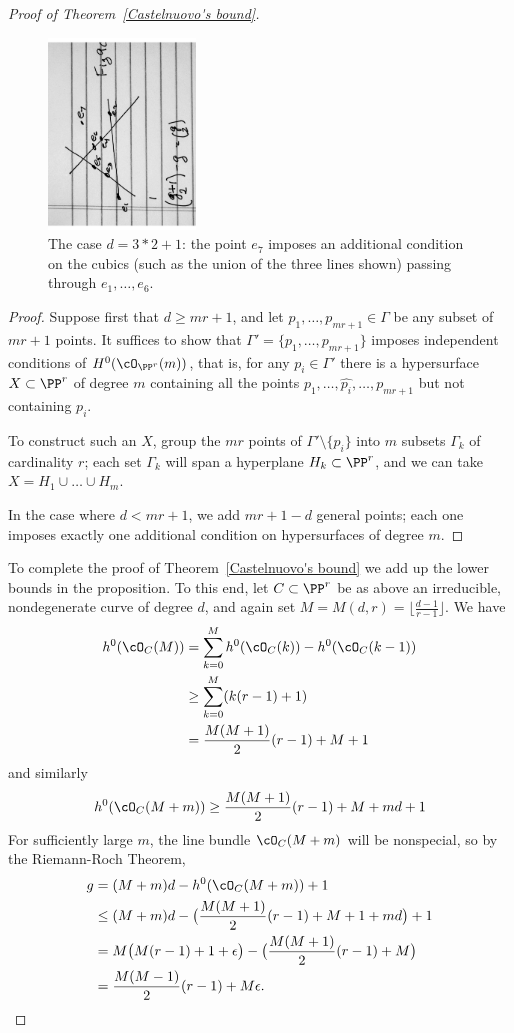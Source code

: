 \begin{proof}[Proof of Theorem~\ref{Castelnuovo's bound}]
\begin{figure}
\begin{center}
\centerline {\includegraphics[height=2in]{"Fig9C.pdf"}}
\caption{The case $d = 3*2+1$: the point $e_{7}$ imposes an additional
condition on the cubics (such as the union of the three lines shown) passing through
$e_{1},\dots, e_{6}$.}
\label{Fig9C}
\end{center}
\end{figure}

\begin{proof}
Suppose first that $d \geq mr+1$, and let $p_1,\dots,p_{mr+1} \in \Gamma$ be any subset of $mr+1$ points. It suffices to show that $\Gamma' = \{p_1,\dots,p_{mr+1}\}$ imposes independent conditions of $H^0(\cO_{\PP^r}(m))$, that is, for any $p_i \in \Gamma'$ there is a hypersurface $X \subset \PP^r$ of degree $m$ containing all the points $p_1,\dots, \hat{p_i},\dots,p_{mr+1}$ but not containing $p_i$.

To construct such an $X$, group the $mr$ points of $\Gamma' \setminus \{p_i\}$ into $m$ subsets $\Gamma_k$ of cardinality $r$; each set $\Gamma_k$ will span a hyperplane $H_k \subset \PP^r$, and we can take $X = H_1 \cup \dots \cup H_m$. 

In the case where $d<mr+1$, we add $mr+1-d$ general points; each one imposes exactly one
additional condition on hypersurfaces of degree $m$.
\end{proof}


To complete the proof of Theorem~\ref{Castelnuovo's bound} we add up the lower bounds in the proposition. To this end, let $C \subset \PP^r$ be as above an irreducible, nondegenerate curve of degree $d$, and again set 
$M = M(d,r) = \lfloor{\frac{d-1}{r-1}}\rfloor$.
We have 
\begin{align*}
h^0(\cO_C(M)) &= \sum_{k=0}^M h^0(\cO_C(k)) - h^0(\cO_C(k-1)) \\
&\geq  \sum_{k=0}^M (k(r-1)+1) \\
&= \frac{M(M+1)}{2}(r-1) + M + 1
\end{align*}
and similarly
$$
h^0(\cO_C(M+m)) \geq \frac{M(M+1)}{2}(r-1) + M  + md+ 1
$$
For sufficiently large $m$, the line bundle $\cO_C(M+m)$ will be nonspecial, so by the Riemann-Roch Theorem,
\begin{align*}
g &= (M+m)d - h^0(\cO_C(M+m)) + 1 \\
&\leq (M+m)d - \bigl(  \frac{M(M+1)}{2}(r-1) + M + 1 + md \bigr)+1 \\
& = M\bigl( M(r-1) + 1 + \epsilon \bigr) - \bigl(  \frac{M(M+1)}{2}(r-1) + M  \bigr) \\
&= \frac{M(M-1)}{2}(r-1) + M\epsilon.
\end{align*}



\end{proof}
